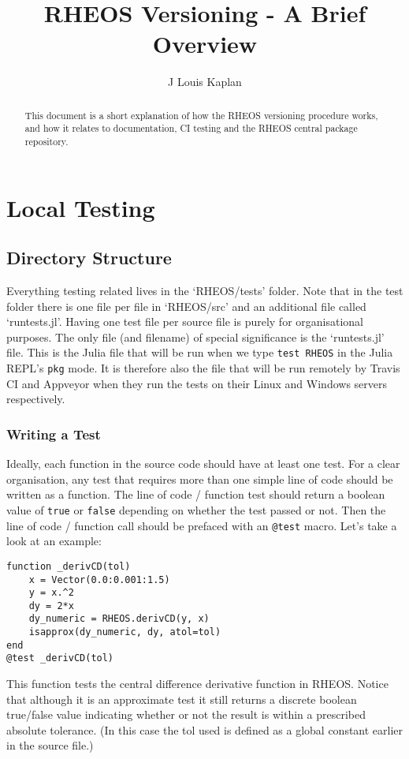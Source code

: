 \documentclass[]{article}
\title{RHEOS Versioning - A Brief Overview}
\author{J Louis Kaplan}
\newcommand{\cod}[1]{\colorbox{light-light-gray}{\texttt{#1}}}
\begin{document}
	
\date{}
\maketitle

\begin{abstract}
This document is a short explanation of how the RHEOS versioning procedure works, and how it relates to documentation, CI testing and the RHEOS central package repository.
\end{abstract}

\section{Local Testing}
\subsection{Directory Structure}
Everything testing related lives in the `RHEOS/tests' folder. Note that in the test folder there is one file per file in `RHEOS/src' and an additional file called `runtests.jl'. Having one test file per source file is purely for organisational purposes. The only file (and filename) of special significance is the `runtests.jl' file. This is the Julia file that will be run when we type \cod{test RHEOS} in the Julia REPL's \cod{pkg} mode. It is therefore also the file that will be run remotely by Travis CI and Appveyor when they run the tests on their Linux and Windows servers respectively.

\subsubsection{Writing a Test}
Ideally, each function in the source code should have at least one test. For a clear organisation, any test that requires more than one simple line of code should be written as a function. The line of code / function test should return a boolean value of \cod{true} or \cod{false} depending on whether the test passed or not. Then the line of code / function call should be prefaced with an \cod{@test} macro. Let's take a look at an example:
\begin{verbatim}
function _derivCD(tol)
    x = Vector(0.0:0.001:1.5)
    y = x.^2
    dy = 2*x
    dy_numeric = RHEOS.derivCD(y, x)
    isapprox(dy_numeric, dy, atol=tol)
end
@test _derivCD(tol)
\end{verbatim}
This function tests the central difference derivative function in RHEOS. Notice that although it is an approximate test it still returns a discrete boolean true/false value indicating whether or not the result is within a prescribed absolute tolerance. (In this case the tol used is defined as a global constant earlier in the source file.)
\end{document}
